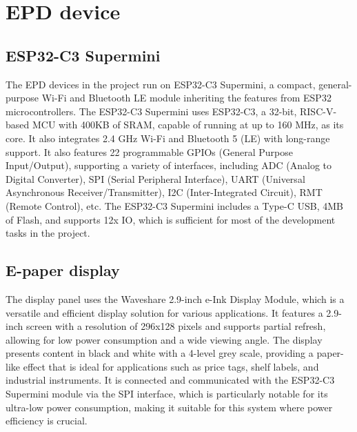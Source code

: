 \documentclass[../Main.tex]{subfiles}
\begin{document}
\section{EPD device}
\subsection{ESP32-C3 Supermini}
The EPD devices in the project run on ESP32-C3 Supermini, a compact, general-purpose Wi-Fi and Bluetooth LE module inheriting the features from ESP32 microcontrollers. The ESP32-C3 Supermini uses ESP32-C3, a 32-bit, RISC-V-based MCU with 400KB of SRAM, capable of running at up to 160 MHz, as its core. It also integrates 2.4 GHz Wi-Fi and Bluetooth 5 (LE) with long-range support. It also features 22 programmable GPIOs (General Purpose Input/Output), supporting a variety of interfaces, including ADC (Analog to Digital Converter), SPI (Serial Peripheral Interface), UART (Universal Asynchronous Receiver/Transmitter), I2C (Inter-Integrated Circuit), RMT (Remote Control), etc. The ESP32-C3 Supermini includes a Type-C USB, 4MB of Flash, and supports 12x IO, which is sufficient for most of the development tasks in the project.

\subsection{E-paper display}

The display panel uses the Waveshare 2.9-inch e-Ink Display Module, which is a versatile and efficient display solution for various applications. It features a 2.9-inch screen with a resolution of 296x128 pixels and supports partial refresh, allowing for low power consumption and a wide viewing angle. The display presents content in black and white with a 4-level grey scale, providing a paper-like effect that is ideal for applications such as price tags, shelf labels, and industrial instruments. It is connected and communicated with the ESP32-C3 Supermini module via the SPI interface, which is particularly notable for its ultra-low power consumption, making it suitable for this system where power efficiency is crucial.
\end{document}
